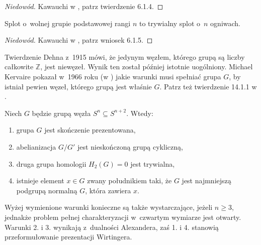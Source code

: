 \begin{proof}[Niedowód]
    Kawauchi w \cite{kawauchi96}, patrz twierdzenie 6.1.4.
\end{proof}

\begin{proposition}
    \label{prop:knot_group_free}
    Splot o~wolnej grupie podstawowej rangi $n$ to trywialny splot o~$n$ ogniwach.
\end{proposition}

\begin{proof}[Niedowód]
    Kawauchi w \cite{kawauchi96}, patrz wniosek 6.1.5.
\end{proof}

Twierdzenie Dehna z~1915 mówi, że jedynym węzłem, którego grupą są liczby całkowite $\mathbb Z$, jest niewęzeł.
Wynik ten został później istotnie uogólniony.
Michael Kervaire pokazał w~1966 roku (w \cite{kervaire65}) jakie warunki musi spełniać grupa $G$, by istniał pewien węzeł, którego grupą jest właśnie $G$.
Patrz też twierdzenie 14.1.1 w \cite{kawauchi96}.

\begin{proposition}
    Niech $G$ będzie grupą węzła $S^n \subseteq S^{n+2}$.
    Wtedy:
    \begin{enumerate}[leftmargin=*]
        \itemsep0em
        \item grupa $G$ jest skończenie prezentowana,
        \item abelianizacja $G/G'$ jest nieskończoną grupą cykliczną,
        \item druga grupa homologii $H_2(G) = 0$ jest trywialna,
        \item istnieje element $x \in G$ zwany południkiem taki, że $G$ jest najmniejszą podgrupą normalną $G$, która zawiera $x$.
    \end{enumerate}
\end{proposition}

Wyżej wymienione warunki konieczne są także wystarczające, jeżeli $n \ge 3$, jednakże problem pełnej charakteryzacji w~czwartym wymiarze jest otwarty.
Warunki 2. i 3. wynikają z~dualności Alexandera, zaś 1. i 4. stanowią przeformułowanie prezentacji Wirtingera.

